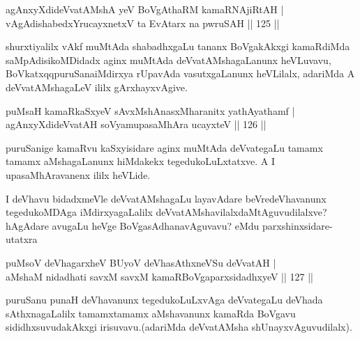 

\begin{shl}
agAnxyXdideVvatAMshA yeV BoVgAthaRM kamaRNA\s jiRtAH |\\
vAgAdishabedxYrucayxnetxV ta EvAtarx na pwruSAH \hfill || 125 ||
\end{shl}

\begin{artha}
shurxtiyalilx vAkf muMtAda shabadhxgaLu tananx BoVgakAkxgi kamaRdiMda saMpAdisikoMDidadx aginx muMtAda deVvatAMshagaLanunx heVLuvavu, BoVkatxqqpuruSana\break iMdirxya rUpavAda vasutxgaLanunx heVLilalx, adariMda A deVvatAMshagaLeV ililx gArxhayxvAgive.
\end{artha}

\begin{shl}
puMsaH kamaRkaSxyeV sAvxMshAnasxMharanitx yathAyathamf |\\
agAnxyXdideVvatAH soV\s yamupasaMhAra ucayxteV \hfill || 126 ||
\end{shl}

\begin{artha}
puruSanige kamaRvu kaSxyisidare aginx muMtAda deVvategaLu tamamx tamamx aMshagaLanunx hiMdakekx tegedukoLuLxtatxve. A I upasaMhAravanenx ililx heVLide.
\end{artha}

\begin{artha}
I deVhavu bidadxmeVle deVvatAMshagaLu layavAdare beVredeVhavanunx tegedukoMDAga iMdirxyagaLalilx deVvatAMshavilalxdaMtAguvudilalxve? hAgAdare avugaLu heVge BoVgasAdhanavAguvavu? eMdu parxshinxsidare- utatxra 
\end{artha}

\begin{shl}
puMsoV deVhagarxheV BUyoV deVhasAthxneVSu deVvatAH |\\
aMshaM nidadhati savxM savxM kamaRBoVgaparxsidadhxyeV \hfill || 127 ||
\end{shl}

\begin{artha}
puruSanu punaH deVhavanunx tegedukoLuLxvAga deVvategaLu deVhada sAthxnagaLalilx tamamxtamamx aMshavanunx kamaRda BoVgavu sididhxsuvudakAkxgi irisuvavu.(adariMda deVvatAMsha shUnayxvAguvudilalx).
\end{artha}


